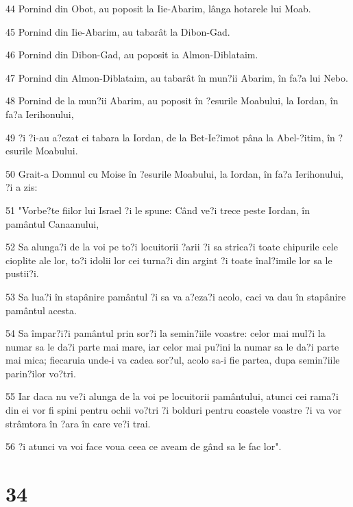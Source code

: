 \par 44 Pornind din Obot, au poposit la Iie-Abarim, lânga hotarele lui Moab.
\par 45 Pornind din Iie-Abarim, au tabarât la Dibon-Gad.
\par 46 Pornind din Dibon-Gad, au poposit ia Almon-Diblataim.
\par 47 Pornind din Almon-Diblataim, au tabarât în mun?ii Abarim, în fa?a lui Nebo.
\par 48 Pornind de la mun?ii Abarim, au poposit în ?esurile Moabului, la Iordan, în fa?a Ierihonului,
\par 49 ?i ?i-au a?ezat ei tabara la Iordan, de la Bet-Ie?imot pâna la Abel-?itim, în ?esurile Moabului.
\par 50 Grait-a Domnul cu Moise în ?esurile Moabului, la Iordan, în fa?a Ierihonului, ?i a zis:
\par 51 "Vorbe?te fiilor lui Israel ?i le spune: Când ve?i trece peste Iordan, în pamântul Canaanului,
\par 52 Sa alunga?i de la voi pe to?i locuitorii ?arii ?i sa strica?i toate chipurile cele cioplite ale lor, to?i idolii lor cei turna?i din argint ?i toate înal?imile lor sa le pustii?i.
\par 53 Sa lua?i în stapânire pamântul ?i sa va a?eza?i acolo, caci va dau în stapânire pamântul acesta.
\par 54 Sa împar?i?i pamântul prin sor?i la semin?iile voastre: celor mai mul?i la numar sa le da?i parte mai mare, iar celor mai pu?ini la numar sa le da?i parte mai mica; fiecaruia unde-i va cadea sor?ul, acolo sa-i fie partea, dupa semin?iile parin?ilor vo?tri.
\par 55 Iar daca nu ve?i alunga de la voi pe locuitorii pamântului, atunci cei rama?i din ei vor fi spini pentru ochii vo?tri ?i bolduri pentru coastele voastre ?i va vor strâmtora în ?ara în care ve?i trai.
\par 56 ?i atunci va voi face voua ceea ce aveam de gând sa le fac lor".

\chapter{34}


